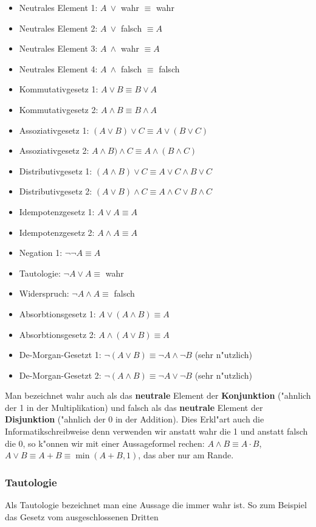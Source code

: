 \begin{itemize}
\item Neutrales Element 1: $A \ \lor $ wahr $\equiv$ wahr
\item Neutrales Element 2: $A \ \lor $ falsch $\equiv A$
\item Neutrales Element 3: $A \ \land $ wahr $\equiv A$
\item Neutrales Element 4: $A \ \land $ falsch $\equiv$ falsch
\item Kommutativgesetz 1: $A \lor B \equiv B \lor A$
\item Kommutativgesetz 2: $A \land B \equiv B \land A$
\item Assoziativgesetz 1: $(A \lor B) \lor C \equiv A \lor (B \lor C)$
\item Assoziativgesetz 2: $A \land B) \land C \equiv A \land (B \land C)$
\item Distributivgesetz 1: $(A \land B) \lor C \equiv A \lor C \land  B \lor C$
\item Distributivgesetz 2: $(A \lor B) \land C \equiv A \land C \lor B \land C$
\item Idempotenzgesetz 1: $A \lor A \equiv A$
\item Idempotenzgesetz 2: $A \land A \equiv A$
\item Negation 1: $\neg \neg A \equiv A$
\item Tautologie: $\neg A \lor A \equiv $ wahr
\item Widerspruch: $\neg A \land A \equiv$ falsch
\item Absorbtionsgesetz 1: $A \lor (A \land B) \equiv A$
\item Absorbtionsgesetz 2: $A \land (A \lor B) \equiv A$
\item De-Morgan-Gesetzt 1: $\neg (A \lor B) \equiv \neg A \land \neg B$ (sehr n"utzlich)
\item De-Morgan-Gesetzt 2: $\neg (A \land B) \equiv \neg A \lor \neg B$ (sehr n"utzlich)
\end{itemize}
Man bezeichnet wahr auch als das \textbf{neutrale} Element der \textbf{Konjunktion} ("ahnlich der 1 in der Multiplikation) und falsch als das \textbf{neutrale} Element der \textbf{Disjunktion} ("ahnlich der 0 in der Addition). Dies Erkl"art auch die Informatikschreibweise denn verwenden wir anstatt wahr die 1 und anstatt falsch die 0, so k"onnen wir mit einer Aussageformel rechen: $A \land B \equiv A \cdot B$, $A \lor B \equiv A + B \equiv \min(A + B, 1)$, das aber nur am Rande.

\subsubsection{Tautologie}
Als Tautologie bezeichnet man eine Aussage die immer wahr ist. So zum Beispiel das Gesetz vom ausgeschlossenen Dritten

